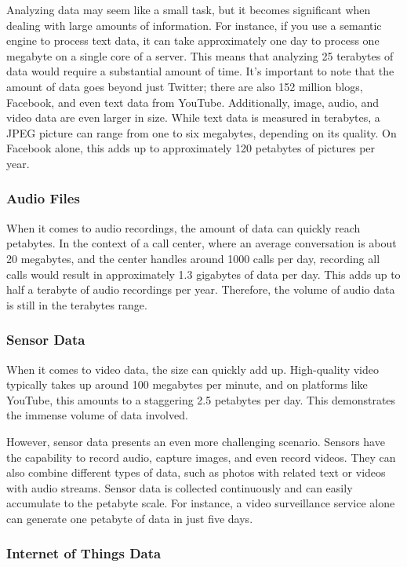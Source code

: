 Analyzing data may seem like a small task, but it becomes significant
when dealing with large amounts of information. For instance, if you use
a semantic engine to process text data, it can take approximately one
day to process one megabyte on a single core of a server. This means
that analyzing 25 terabytes of data would require a substantial amount
of time. It's important to note that the amount of data goes beyond just
Twitter; there are also 152 million blogs, Facebook, and even text data
from YouTube. Additionally, image, audio, and video data are even larger
in size. While text data is measured in terabytes, a JPEG picture can
range from one to six megabytes, depending on its quality. On Facebook
alone, this adds up to approximately 120 petabytes of pictures per year.

\subsubsection{Audio Files}

When it comes to audio recordings, the amount of data can quickly reach
petabytes. In the context of a call center, where an average
conversation is about 20 megabytes, and the center handles around 1000
calls per day, recording all calls would result in approximately 1.3
gigabytes of data per day. This adds up to half a terabyte of audio
recordings per year. Therefore, the volume of audio data is still in the
terabytes range.

\subsubsection{Sensor Data}

When it comes to video data, the size can quickly add up. High-quality
video typically takes up around 100 megabytes per minute, and on
platforms like YouTube, this amounts to a staggering 2.5 petabytes per
day. This demonstrates the immense volume of data involved.

However, sensor data presents an even more challenging scenario. Sensors
have the capability to record audio, capture images, and even record
videos. They can also combine different types of data, such as photos
with related text or videos with audio streams. Sensor data is collected
continuously and can easily accumulate to the petabyte scale. For
instance, a video surveillance service alone can generate one petabyte
of data in just five days.

\subsubsection{Internet of Things Data}

